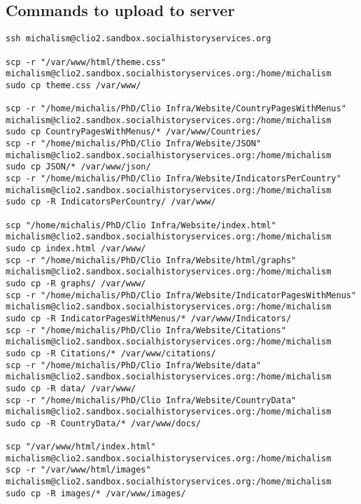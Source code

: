 \documentclass[a4paper]{article}
\begin{document}
\subsection{Commands to upload to server}
\begin{verbatim}
ssh michalism@clio2.sandbox.socialhistoryservices.org

scp -r "/var/www/html/theme.css" 
michalism@clio2.sandbox.socialhistoryservices.org:/home/michalism
sudo cp theme.css /var/www/

scp -r "/home/michalis/PhD/Clio Infra/Website/CountryPagesWithMenus" 
michalism@clio2.sandbox.socialhistoryservices.org:/home/michalism
sudo cp CountryPagesWithMenus/* /var/www/Countries/
scp -r "/home/michalis/PhD/Clio Infra/Website/JSON" 
michalism@clio2.sandbox.socialhistoryservices.org:/home/michalism
sudo cp JSON/* /var/www/json/
scp -r "/home/michalis/PhD/Clio Infra/Website/IndicatorsPerCountry" 
michalism@clio2.sandbox.socialhistoryservices.org:/home/michalism
sudo cp -R IndicatorsPerCountry/ /var/www/

scp "/home/michalis/PhD/Clio Infra/Website/index.html" 
michalism@clio2.sandbox.socialhistoryservices.org:/home/michalism
sudo cp index.html /var/www/
scp -r "/home/michalis/PhD/Clio Infra/Website/html/graphs" 
michalism@clio2.sandbox.socialhistoryservices.org:/home/michalism
sudo cp -R graphs/ /var/www/
scp -r "/home/michalis/PhD/Clio Infra/Website/IndicatorPagesWithMenus" 
michalism@clio2.sandbox.socialhistoryservices.org:/home/michalism
sudo cp -R IndicatorPagesWithMenus/* /var/www/Indicators/
scp -r "/home/michalis/PhD/Clio Infra/Website/Citations" 
michalism@clio2.sandbox.socialhistoryservices.org:/home/michalism
sudo cp -R Citations/* /var/www/citations/
scp -r "/home/michalis/PhD/Clio Infra/Website/data" 
michalism@clio2.sandbox.socialhistoryservices.org:/home/michalism
sudo cp -R data/ /var/www/
scp -r "/home/michalis/PhD/Clio Infra/Website/CountryData" 
michalism@clio2.sandbox.socialhistoryservices.org:/home/michalism
sudo cp -R CountryData/* /var/www/docs/

scp "/var/www/html/index.html" 
michalism@clio2.sandbox.socialhistoryservices.org:/home/michalism
scp -r "/var/www/html/images" 
michalism@clio2.sandbox.socialhistoryservices.org:/home/michalism
sudo cp -R images/* /var/www/images/
\end{verbatim}

\end{document}
